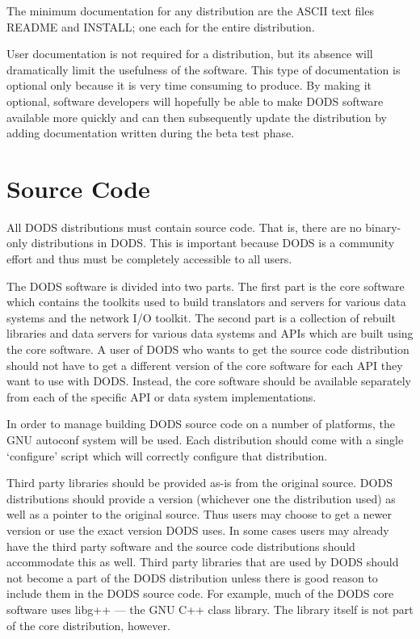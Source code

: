 The minimum documentation for any distribution are the ASCII text
files README and INSTALL; one each for the entire distribution.

User documentation is not required for a distribution, but its absence
will dramatically limit the usefulness of the software. This type of
documentation is optional only because it is very time consuming to
produce. By making it optional, software developers will hopefully be
able to make DODS software available more quickly and can then
subsequently update the distribution by adding documentation written
during the beta test phase. 

\section{Source Code}

All DODS distributions must contain source code. That is, there are no
binary-only distributions in DODS. This is important because DODS is a
community effort and thus must be completely accessible to all users.

The DODS software is divided into two parts. The first part is the
core software which contains the toolkits used to build translators
and servers for various data systems and the network I/O toolkit. The
second part is a collection of rebuilt libraries and data servers for
various data systems and APIs which are built using the core software.
A user of DODS who wants to get the source code distribution should
not have to get a different version of the core software for each API
they want to use with DODS. Instead, the core software should be
available separately from each of the specific API or data system
implementations. 

In order to manage building DODS source code on a number of platforms,
the GNU autoconf system will be used. Each distribution should come
with a single `configure' script which will correctly configure that
distribution.

Third party libraries should be provided as-is from the original
source. DODS distributions should provide a version (whichever one the
distribution used) as well as a pointer to the original source. Thus
users may choose to get a newer version or use the exact version DODS
uses. In some cases users may already have the third party software
and the source code distributions should accommodate this as well.
Third party libraries that are used by DODS should not become a part
of the DODS distribution unless there is good reason to include them
in the DODS source code. For example, much of the DODS core software
uses libg++ --- the GNU C++ class library. The library itself is not
part of the core distribution, however.

